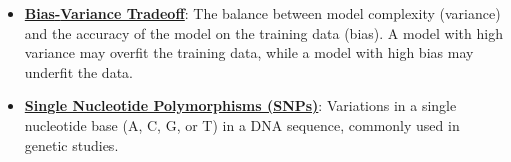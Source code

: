 \documentclass{article}%
\begin{document}
\begin{itemize}[leftmargin=*]
\item \href{https://purdue.brightspace.com/d2l/common/assets/pdfjs-d2l-dist/1.0.14-legacy/web/viewer.html?file=\%2Fcontent\%2Fenforced\%2F1095467-wl.202510.CS.24300.001\%2F11L2-svd-pca-recommender.pdf\%3Fou\%3D1095467\&lang=en-us\&container=d2l-fileviewer-rendered-pdf\&fullscreen=d2l-fileviewer-rendered-pdf-dialog\&height=667#page=53}{\textbf{Bias{-}Variance Tradeoff}}: The balance between model complexity (variance) and the accuracy of the model on the training data (bias). A model with high variance may overfit the training data, while a model with high bias may underfit the data.%
\item \href{https://purdue.brightspace.com/d2l/common/assets/pdfjs-d2l-dist/1.0.14-legacy/web/viewer.html?file=\%2Fcontent\%2Fenforced\%2F1095467-wl.202510.CS.24300.001\%2F11L2-svd-pca-recommender.pdf\%3Fou\%3D1095467\&lang=en-us\&container=d2l-fileviewer-rendered-pdf\&fullscreen=d2l-fileviewer-rendered-pdf-dialog\&height=667#page=26}{\textbf{Single Nucleotide Polymorphisms (SNPs)}}: Variations in a single nucleotide base (A, C, G, or T) in a DNA sequence, commonly used in genetic studies.%
\end{itemize}%
\end{document}
